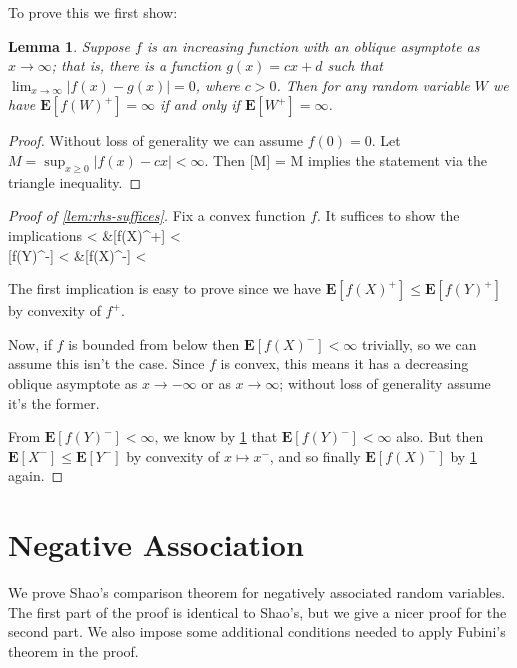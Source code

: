 \documentclass{article}
\newtheorem{lemma}[theorem]{Lemma}
\newcommand*{\E}[0]{\mathbf{E}}
\def\[#1\]{\begin{align*}#1\end{align*}}
\begin{document}
To prove this we first show:

\begin{lemma}\label{lem:asymptote}
  Suppose $f$ is an increasing function with an oblique asymptote as $x \to \infty$;
  that is, there is a function $g(x) = cx + d$ such that $\lim_{x \to \infty} |f(x) - g(x)| = 0$, where $c > 0$.
  Then for any random variable $W$ we have $\E[f(W)^+] = \infty$ if and only if $\E[W^+] = \infty$.
\end{lemma}
\begin{proof}
  Without loss of generality we can assume $f(0) = 0$.
  Let $M = \sup_{x \ge 0} |f(x) - cx| < \infty$.
  Then \[\E[|f(W)^+ - cW^+|] \le \E[M] = M\]
  implies the statement via the triangle inequality.
\end{proof}

\begin{proof}[Proof of \cref{lem:rhs-suffices}]
  Fix a convex function $f$.
  It suffices to show the implications
  \[
  \E[f(Y)^+] < \infty &\to \E[f(X)^+] < \infty \\
  \E[f(Y)^-] < \infty &\to \E[f(X)^-] < \infty \\
  \]

  The first implication is easy to prove since we have $\E[f(X)^+] \le \E[f(Y)^+]$
  by convexity of $f^+$.

  Now, if $f$ is bounded from below then $\E[f(X)^-] < \infty$ trivially, so we can assume this isn't the case.
  Since $f$ is convex, this means it has a decreasing oblique asymptote as $x \to -\infty$ or as $x \to \infty$; without loss of generality assume it's the former.

  From $\E[f(Y)^-] < \infty$, we know by \cref{lem:asymptote} that $\E[f(Y)^-] < \infty$ also.
  But then $\E[X^-] \le \E[{Y}^-]$ by convexity of $x \mapsto x^-$,
  and so finally $\E[f(X)^-]$ by \cref{lem:asymptote} again.
\end{proof}

\section*{Negative Association}


We prove Shao's comparison theorem for negatively associated random variables.  The first part of the proof is identical to Shao's, but we give a nicer proof for the second part.  We also impose some additional conditions needed to apply Fubini's theorem in the proof.
\end{document}
